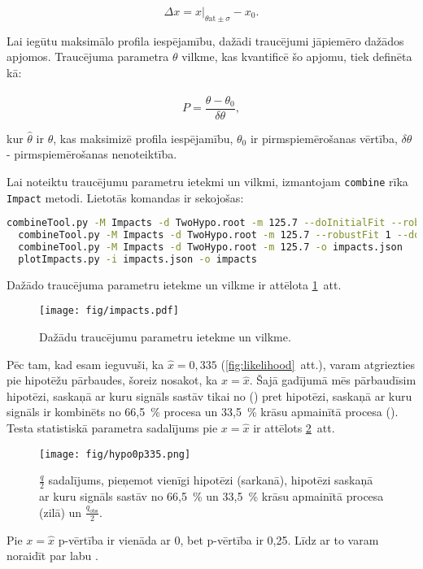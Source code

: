 \begin{equation}
  \Delta x = x\bigg\rvert_{\theta \text{at} \pm\sigma}-x_{0}.
\end{equation} 

Lai iegūtu maksimālo profila iespējamību, dažādi traucējumi jāpiemēro dažādos apjomos. Traucējuma parametra $\theta$ vilkme, kas kvantificē šo apjomu, tiek definēta kā:

\begin{equation}
  P = \frac{\hat{\theta}-\theta_{0}}{\delta\theta},
\end{equation} 

\noindent kur $\hat{\theta}$ ir $\theta$, kas maksimizē profila iespējamību, $\theta_{0}$ ir pirmspiemērošanas vērtība, $\delta\theta$ - pirmspiemērošanas nenoteiktība.

Lai noteiktu traucējumu parametru ietekmi un vilkmi, izmantojam \lstinline[language=sh]|combine| rīka \lstinline[language=sh]|Impact| metodi. Lietotās komandas ir sekojošas:

\begin{lstlisting}[language=sh, breaklines=true]
  combineTool.py -M Impacts -d TwoHypo.root -m 125.7 --doInitialFit --robustFit 1
  combineTool.py -M Impacts -d TwoHypo.root -m 125.7 --robustFit 1 --doFits
  combineTool.py -M Impacts -d TwoHypo.root -m 125.7 -o impacts.json
  plotImpacts.py -i impacts.json -o impacts
\end{lstlisting}

Dažādo traucējuma parametru ietekme un vilkme ir attēlota \ref{fig:impacts}~att.

\begin{figure}
  \centering
  \texttt{[image: fig/impacts.pdf]}
  \caption{Dažādu traucējumu parametru ietekme un vilkme.}
  \label{fig:impacts}
\end{figure}

Pēc tam, kad esam ieguvuši, ka $\hat{x}=0,335$ (\ref{fig:likelihood}~att.), varam atgriezties pie hipotēžu pārbaudes, šoreiz nosakot, ka $x=\hat{x}$. Šajā gadījumā mēs pārbaudīsim hipotēzi, saskaņā ar kuru signāls sastāv tikai no \ttbar (\Hnull) pret hipotēzi, saskaņā ar kuru signāls ir kombinēts no 66,5~\% \ttbar procesa un 33,5~\% krāsu apmainītā \ttbar procesa (\Halt). Testa statistiskā parametra sadalījums pie $x=\hat{x}$ ir attēlots \ref{fig:hypo0p335}~att.

\begin{figure}
  \centering
  \texttt{[image: fig/hypo0p335.png]}
  \caption{$\frac{q}{2}$ sadalījums, pieņemot vienīgi \ttbar hipotēzi (sarkanā), hipotēzi saskaņā ar kuru signāls sastāv no 66,5~\% \ttbar un 33,5~\% krāsu apmainītā \ttbar procesa (zilā) un $\frac{q_{\text{obs}}}{2}$.}
  \label{fig:hypo0p335}
\end{figure}

Pie $x=\hat{x}$ \Hnull p-vērtība ir vienāda ar 0, bet \Halt p-vērtība ir 0,25. Līdz ar to varam noraidīt \Hnull par labu \Halt.
